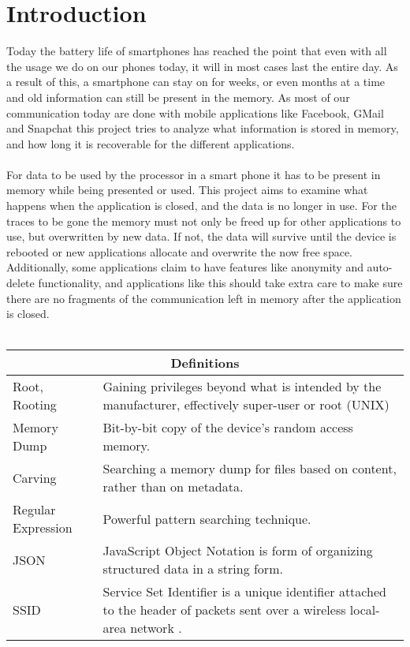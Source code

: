 \section{Introduction}
Today the battery life of smartphones has reached the point that even with all the usage we do on our phones today, it will in most cases last the entire day. As a result of this, a smartphone can stay on for weeks, or even months at a time and old information can still be present in the memory. As most of our communication today are done with mobile applications like Facebook, GMail and Snapchat this project tries to analyze what information is stored in memory, and how long it is recoverable for the different applications. \\ \\
For data to be used by the processor in a smart phone it has to be present in memory while being presented or used. This project aims to examine what happens when the application is closed, and the data is no longer in use. For the traces to be gone the memory must not only be freed up for other applications to use, but overwritten by new data. If not, the data will survive until the device is rebooted or new applications allocate and overwrite the now free space. Additionally, some applications claim to have features like anonymity and auto-delete functionality, and applications like this should take extra care to make sure there are no fragments of the communication left in memory after the application is closed.
\\ \\
\begin{tabular}{ |p{3cm}|p{4cm}|  }
 \hline
 \multicolumn{2}{|c|}{\textbf{Definitions}} \\
 \hline
 Root, Rooting&Gaining privileges beyond what is intended by the manufacturer, effectively super-user or root (UNIX) \\
 \hline
  Memory Dump& Bit-by-bit copy of the device's random access memory.\\
 \hline
 Carving& Searching a memory dump for  files based on content, rather than on metadata.\\
 \hline
 Regular Expression & Powerful pattern searching technique.\\
 \hline
 JSON & JavaScript Object Notation is form of organizing structured data in a string form.\\
 \hline
 SSID & Service Set Identifier is a unique identifier attached to the header of packets sent over a wireless local-area network .\\
 \hline
\end{tabular}